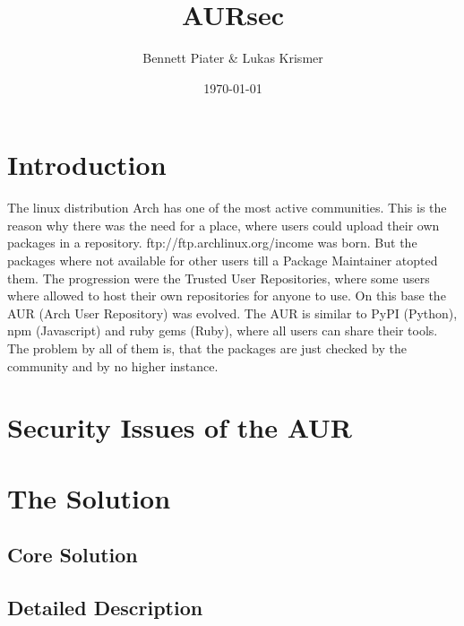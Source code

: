 \documentclass{scrartcl}
\title{AURsec}
\author{Bennett Piater \& Lukas Krismer}
\date{\today}
\begin{document}
  \thispagestyle{empty}

  


  \begin{abstract}
  \end{abstract}

  \tableofcontents
  \listoffigures
  \listoftables
  \pagebreak


  \section{Introduction}  %
  The linux distribution Arch has one of the most active communities. This is the reason why there was the need for a place, where users could upload their own packages in a repository.
  ftp://ftp.archlinux.org/income was born. But the packages where not available for other users till a Package Maintainer atopted them.
  The progression were the Trusted User Repositories, where some users where allowed to host their own repositories for anyone to use. On this base the AUR (Arch User Repository) was evolved. The AUR is similar to PyPI (Python), npm (Javascript) and ruby gems (Ruby), where all users can share their tools. The problem by all of them is, that the packages are just checked by the community and by no higher instance. \cite{wiki:AUR} 

  \section{Security Issues of the AUR} %
  
  \section{The Solution} %
    \subsection{Core Solution}  %
    
    \subsection{Detailed Description} %
\end{document}
